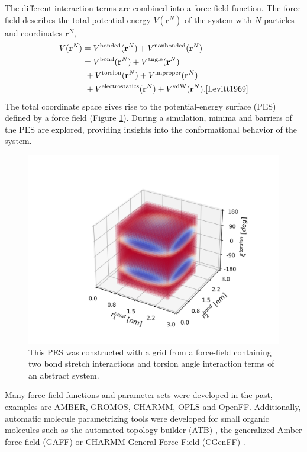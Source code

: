 The different interaction terms are combined into a force-field function. The force field describes the total potential energy $V(\textbf{r}^N)$ of the system with $N$ particles and coordinates $\textbf{r}^N$, 
\begin{equation}
\begin{split}
    V(\textbf{r}^N) &= V^\text{bonded}(\textbf{r}^N) + V^\text{nonbonded}(\textbf{r}^N)\\
          &= V^\text{bond}(\textbf{r}^N) + V^\text{angle}(\textbf{r}^N) \\
          &~ + V^\text{torsion}(\textbf{r}^N) + V^\text{improper}(\textbf{r}^N) \\
          &~ + V^\text{electrostatics}(\textbf{r}^N) + V^\text{vdW}(\textbf{r}^N) .\cite{Levitt1969}
\end{split}
\end{equation}
The total coordinate space gives rise to the potential-energy surface (PES) defined by a force field (Figure \ref{fig:ffPES}).
During a simulation, minima and barriers of the PES are explored, providing insights into the conformational behavior of the system.

\begin{figure}
    \centering
    \includegraphics[width=\textwidth]{2_chapter_intro/fig/ForceField/bondterms.png}
    \caption{This PES was constructed with a grid from a force-field containing two bond stretch interactions and torsion angle interaction terms of an abstract system.}
    \label{fig:ffPES}
\end{figure}

Many force-field functions and parameter sets were developed in the past, examples are AMBER\cite{Weiner1981, Pearlman1995, Cornell1995, Lindorfflarsen2010}, GROMOS\cite{Daura1998, Oostenbrink2004, Schuler2001, Schmid2011,Malde2011, Stroet2018}, CHARMM\cite{Brooks1983, Mackerell1995, Mackerell1998}, OPLS \cite{Jorgensen1988, Jorgensen1996} and OpenFF.\cite{Qiu2021}
Additionally, automatic molecule parametrizing tools were developed for small organic molecules such as the automated topology builder (ATB) \cite{Malde2011, Stroet2018}, the generalized Amber force field (GAFF)\cite{Sprenger2015} or CHARMM General Force Field (CGenFF) \cite{Vanommeslaeghe2010}.

